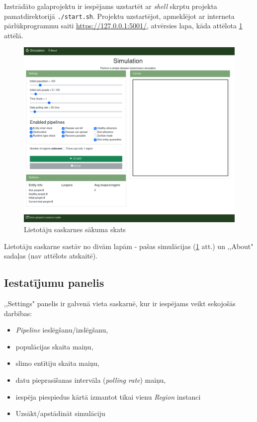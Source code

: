 

Izstrādāto galaprojektu ir iespējams uzstartēt ar \emph{shell} skrptu projekta
pamatdirektorijā \texttt{./start.sh}.
Projektu uzstartējot, apmeklējot ar interneta pārlūkprogrammu saiti
\url{https://127.0.0.1:5001/}, atvērsies lapa, kāda attēlota \ref{img:whole-ui} attēlā.

\begin{figure}[H]
	\centering
	\includegraphics[scale=0.4]{images/ui-whole-page.png}
	\caption{Lietotāju saskarnes sākuma skats}
	\label{img:whole-ui}
\end{figure}

Lietotāju saskarne sastāv no divām lapām - pašas simulācijas (\ref{img:whole-ui}
att.) un ,,About" sadaļas (nav attēlots atskaitē).

\subsection{Iestatījumu panelis}

,,Settings" panelis ir galvenā vieta saskarnē, kur ir iespējams veikt sekojošās darbības:

\begin{itemize}
    \item \emph{Pipeline} ieslēgšanu/izslēgšanu,
    \item populācijas skaita maiņu,
    \item slimo entītiju skaita maiņu,
    \item datu pieprasīšanas intervāla (\emph{polling rate}) maiņu,
    \item iespēja piespiedus kārtā izmantot tikai vienu \emph{Region} instanci
    \item Uzsākt/apstādināt simulāciju
\end{itemize}


